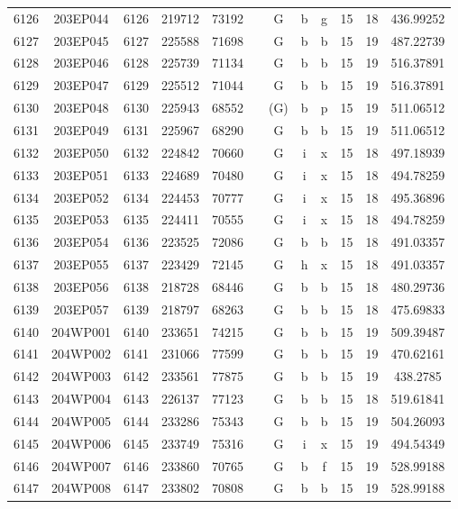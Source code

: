 \begin{tabular}{|*{12}{c|}}
6126 & 203EP044 & 6126 & 219712 & 73192 &  & G & b & g & 15 & 18 & 436.99252 \\ 
6127 & 203EP045 & 6127 & 225588 & 71698 &  & G & b & b & 15 & 19 & 487.22739 \\ 
6128 & 203EP046 & 6128 & 225739 & 71134 &  & G & b & b & 15 & 19 & 516.37891 \\ 
6129 & 203EP047 & 6129 & 225512 & 71044 &  & G & b & b & 15 & 19 & 516.37891 \\ 
6130 & 203EP048 & 6130 & 225943 & 68552 &  & (G) & b & p & 15 & 19 & 511.06512 \\ 
6131 & 203EP049 & 6131 & 225967 & 68290 &  & G & b & b & 15 & 19 & 511.06512 \\ 
6132 & 203EP050 & 6132 & 224842 & 70660 &  & G & i & x & 15 & 18 & 497.18939 \\ 
6133 & 203EP051 & 6133 & 224689 & 70480 &  & G & i & x & 15 & 18 & 494.78259 \\ 
6134 & 203EP052 & 6134 & 224453 & 70777 &  & G & i & x & 15 & 18 & 495.36896 \\ 
6135 & 203EP053 & 6135 & 224411 & 70555 &  & G & i & x & 15 & 18 & 494.78259 \\ 
6136 & 203EP054 & 6136 & 223525 & 72086 &  & G & b & b & 15 & 18 & 491.03357 \\ 
6137 & 203EP055 & 6137 & 223429 & 72145 &  & G & h & x & 15 & 18 & 491.03357 \\ 
6138 & 203EP056 & 6138 & 218728 & 68446 &  & G & b & b & 15 & 18 & 480.29736 \\ 
6139 & 203EP057 & 6139 & 218797 & 68263 &  & G & b & b & 15 & 18 & 475.69833 \\ 
6140 & 204WP001 & 6140 & 233651 & 74215 &  & G & b & b & 15 & 19 & 509.39487 \\ 
6141 & 204WP002 & 6141 & 231066 & 77599 &  & G & b & b & 15 & 19 & 470.62161 \\ 
6142 & 204WP003 & 6142 & 233561 & 77875 &  & G & b & b & 15 & 19 & 438.2785 \\ 
6143 & 204WP004 & 6143 & 226137 & 77123 &  & G & b & b & 15 & 18 & 519.61841 \\ 
6144 & 204WP005 & 6144 & 233286 & 75343 &  & G & b & b & 15 & 19 & 504.26093 \\ 
6145 & 204WP006 & 6145 & 233749 & 75316 &  & G & i & x & 15 & 19 & 494.54349 \\ 
6146 & 204WP007 & 6146 & 233860 & 70765 &  & G & b & f & 15 & 19 & 528.99188 \\ 
6147 & 204WP008 & 6147 & 233802 & 70808 &  & G & b & b & 15 & 19 & 528.99188 \\ 

\end{tabular}
